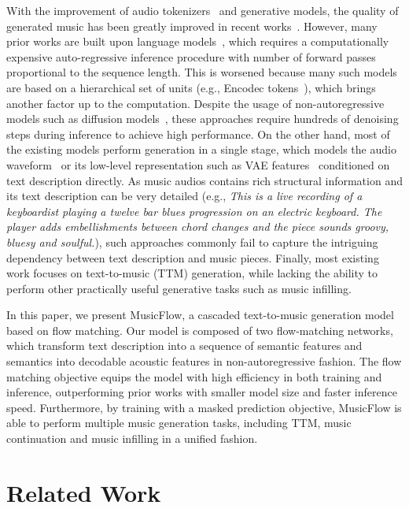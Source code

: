 With the improvement of audio tokenizers~\cite{zeghidour2021soundstream,defossez2022highfi} and generative models, the quality of generated music has been greatly improved in recent works~\cite{musiclm,musicgen}. However, many prior works are built upon language models~\cite{musiclm,musicgen,yang2023uniaudio}, which requires a computationally expensive auto-regressive inference procedure with number of forward passes proportional to the sequence length. This is worsened because many such models are based on a hierarchical set of units (e.g., Encodec tokens~\cite{musicgen}), which brings another factor up to the computation. Despite the usage of non-autoregressive models such as diffusion models~\cite{audio-ldm2,noise2music,forsgren2022riffusion,schneider2023mousai}, these approaches require hundreds of denoising steps during inference to achieve high performance. On the other hand, most of the existing models perform generation in a single stage, which models the audio waveform~\cite{noise2music} or its low-level representation such as VAE features~\cite{audio-ldm2} conditioned on text description directly. As music audios contains rich structural information and its text description can be very detailed (e.g., \emph{This is a live recording of a keyboardist playing a twelve bar blues progression on an electric keyboard. The player
adds embellishments between chord changes and the piece sounds groovy, bluesy and soulful.}), such approaches commonly fail to capture the intriguing dependency between text description and music pieces. Finally, most existing work focuses on text-to-music (TTM) generation, while lacking the ability to perform other practically useful generative tasks such as music infilling.

In this paper, we present MusicFlow, a cascaded text-to-music generation model based on flow matching. Our model is composed of two flow-matching networks, which transform text description into a sequence of semantic features and semantics into decodable acoustic features in non-autoregressive fashion. The flow matching objective equips the model with high efficiency in both training and inference, outperforming prior works with smaller model size and faster inference speed. Furthermore, by training with a masked prediction objective, MusicFlow is able to perform multiple music generation tasks, including TTM, music continuation and music infilling in a unified fashion.

\section{Related Work}
\label{sec:related}

